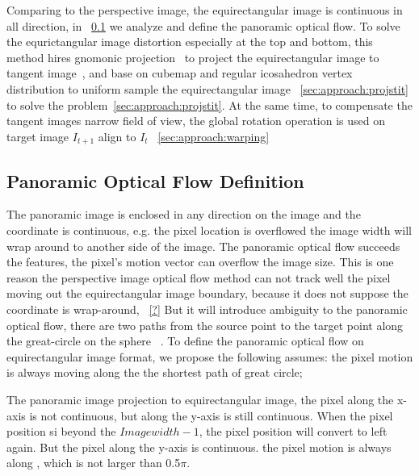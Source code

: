 % 
Comparing to the perspective image, the equirectangular image is continuous in all direction, in ~\cref{sec:approach:definition} we analyze and define the panoramic optical flow.
%
To solve the equrictangular image distortion especially at the top and bottom, this method hires gnomonic projection~\cite{?} to project the equirectangular image to tangent image~\cite{?}, and base on cubemap and regular icosahedron vertex distribution to uniform sample the equirectangular image ~\cref{sec:approach:projstit} to solve the problem~\cref{sec:approach:projstit}.
%
At the same time, to compensate the tangent images narrow field of view, the global rotation operation is used on target image $I_{t+1}$ align to $I_t$ ~\cref{sec:approach:warping}


\subsection{Panoramic Optical Flow Definition}
\label{sec:approach:definition}

The panoramic image is enclosed in any direction on the image and the coordinate is continuous, e.g. the pixel location is overflowed the image width will wrap around to another side of the image.
The panoramic optical flow succeeds the features, the pixel's motion vector can overflow the image size.
This is one reason the perspective image optical flow method can not track well the pixel moving out the equirectangular image boundary, because it does not suppose the coordinate is wrap-around, ~\cref{?}
%
But it will introduce ambiguity to the panoramic optical flow, 
there are two paths from the source point to the target point along the great-circle on the sphere ~\cite{??}.
To define the panoramic optical flow on equirectangular image format, we propose the following assumes:
the pixel motion is always moving along the the shortest path of great circle;

The panoramic image projection to equirectangular image, the pixel along the x-axis is not continuous, but along the y-axis is still continuous. When the pixel position si beyond the  ${Imagewidth -1}$, the pixel position will convert to left again.
But the pixel along the y-axis is continuous.
the pixel motion is always along , which is not larger than 0.5$\pi$.

